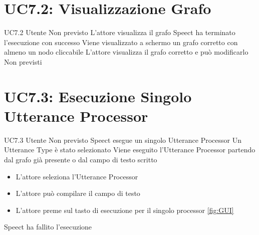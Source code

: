 \documentclass[../AnalisideiRequisiti.tex]{subfiles}
\begin{document}
\section{UC7.2: Visualizzazione Grafo}
\UserCase
{UC7.2}
{Utente}
{Non previsto}
{L'attore visualizza il grafo}
{Speect ha terminato l'esecuzione con successo }
{Viene visualizzato a schermo un grafo corretto con almeno un nodo cliccabile}
{
	L'attore visualizza il grafo corretto e può modificarlo 
}
{Non previsti}

\section{UC7.3: Esecuzione Singolo Utterance Processor}
\UserCase
{UC7.3}
{Utente}
{Non previsto}
{Speect esegue un singolo Utterance Processor}
{Un Utterance Type è stato selezionato  }
{Viene eseguito l'Utterance Processor partendo dal grafo già presente o dal campo di testo scritto}
{
	\begin{itemize}
		\item{} L'attore seleziona l'Utterance Processor 
		\item{} L'attore può compilare il campo di testo
		\item{} L'attore preme sul tasto di esecuzione per il singolo processor \ref{fig:GUI}
	\end{itemize}
}
{Speect ha fallito l'esecuzione}
\end{document}
